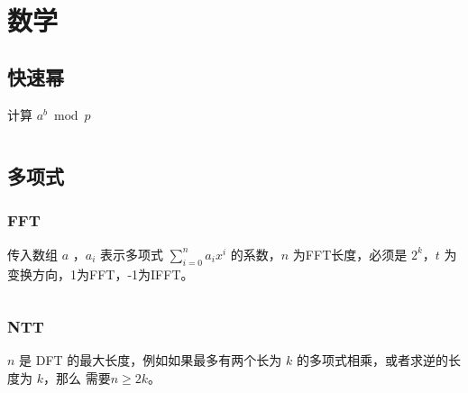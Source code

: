 \documentclass[a4paper, twoside]{article}
\title{\vspace{20cm}\fontsize{50pt}{20pt}\selectfont{Standard Code Library}\\\fontsize{24pt}{\baselineskip}\selectfont{}\vspace{0.1cm}}
\author{\fontsize{15pt}{\baselineskip}\selectfont{XXX University}\vspace{0.2cm}\\\fontsize{12pt}{\baselineskip}\selectfont{WSFcloud}}
\date{}
\begin{document}
\begin{titlepage}
    \selectfont{\color{black}{\maketitle}}
	\thispagestyle{empty}
	\afterpage{\null\thispagestyle{empty}\newpage} %
\end{titlepage}

\pagestyle{plain}
\setcounter{page}{1}
\renewcommand{\contentsname}{\Huge \textbf{目录}}           %
\renewcommand{\cftsecdotsep}{4}                             %
\renewcommand{\cftsubsecdotsep}{4}                          %
\renewcommand{\cftsecfont}{\large\bfseries}                 %
\begin{center}
    \tableofcontents         
\end{center}
\ifodd\value{page}
    \afterpage{\null\thispagestyle{empty}\newpage}          %
\fi

\newpage
\pagestyle{fancy}
\setcounter{page}{1}
\section{数学}
\subsection{快速幂}
计算 $a^b \bmod p$
\inputminted{cpp}{../src/数学/快速幂.cpp}
\subsection{多项式}
    \subsubsection{FFT}
    传入数组 $a$ ，$a_i$ 表示多项式 $\sum\limits_{i=0}^{n} a_ix^i$ 的系数，$n$ 为FFT长度，必须是 $2^k$，$t$ 为变换方向，1为FFT，-1为IFFT。
    \inputminted{cpp}{../src/数学/FFT.cpp}
    
    \subsubsection{NTT}
    $n$ 是 DFT 的最大长度，例如如果最多有两个长为 $k$ 的多项式相乘，或者求逆的长度为 $k$，那么 需要$n \geq 2k$。
    \inputminted{cpp}{../src/数学/NTT.cpp}
\end{document}
